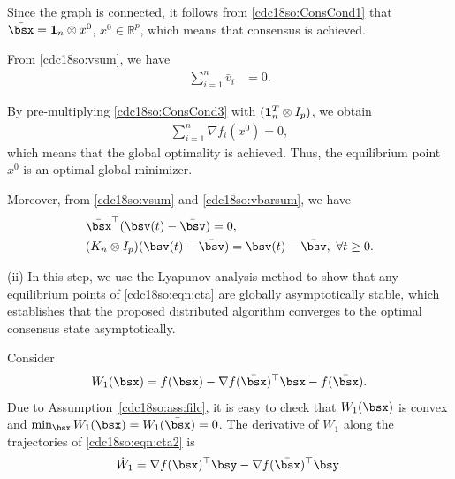 \documentclass[letterpaper, 10 pt, conference]{ieeeconf}  %
\begin{document}
Since the graph is connected, it follows from \eqref{cdc18so:ConsCond1} that $\bar{\bsx}={\bf 1}_n \otimes x^0$, $x^0 \in \mathbb{R}^p$, which means that consensus is achieved.

From \eqref{cdc18so:vsum}, we have
\begin{align}
\sum_{i=1}^n\bar{v}_i&=0.\label{cdc18so:vbarsum}
\end{align}

By pre-multiplying \eqref{cdc18so:ConsCond3} with $({\bf 1}^T_n \otimes I_p)$, we obtain
\begin{align*}
\sum_{i=1}^n\nabla  f_i(x^0)=0,
\end{align*}
which means that the global optimality is achieved. Thus, the equilibrium point $x^0$ is an optimal global minimizer.

Moreover, from \eqref{cdc18so:vsum} and \eqref{cdc18so:vbarsum}, we have
\begin{align}\label{cdc18so:vvbar}
&\bar{\bsx}^\top(\bsv(t)-\bar{\bsv})=0,\nonumber\\
&(K_n\otimes I_p)(\bsv(t)-\bar{\bsv})=\bsv(t)-\bar{\bsv},~\forall t\ge0.
\end{align}

(ii) In this step, we use the Lyapunov analysis method to show that any equilibrium points of \eqref{cdc18so:eqn:cta} are globally asymptotically stable, which establishes that
the proposed distributed algorithm converges to the optimal consensus state asymptotically.

Consider
\begin{align}
W_1(\bsx)=f(\bsx)-\nabla  f(\bar{\bsx})^\top \bsx-f(\bar{\bsx}).%
\end{align}
Due to Assumption~\ref{cdc18so:ass:filc},
it is easy to check that $W_1(\bsx)$ is  convex and $\min_{\bsx}W_1(\bsx)=W_1(\bar{\bsx})=0$.
The derivative of $W_1$ along the trajectories of \eqref{cdc18so:eqn:cta2} is
\begin{align}\label{cdc18so:w1dot}
\dot{W}_1=\nabla  f(\bsx)^\top \bsy-\nabla  f(\bar{\bsx})^\top \bsy.
\end{align}
\end{document}
